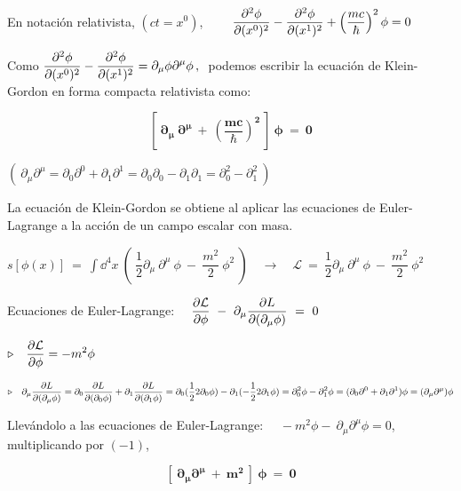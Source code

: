 En notación relativista, $(ct=x^0)$,
$\qquad \displaystyle \pdv[2]{\phi}{(x^0)} - \pdv[2]{\phi}{(x^1)} + \left(\dfrac{mc}{\hbar} \right)^2 \phi=0$

Como $\displaystyle \pdv[2]{\phi}{(x^0)} - \pdv[2]{\phi}{(x^1)}=\partial_\mu \phi \partial^\mu \phi\, , \ $ podemos escribir la ecuación de Klein-Gordon en forma compacta relativista como:

\begin{equation}
\label{T33EcK-G}
\boldsymbol{ \boxed{\ \  
\left[ \ \partial_\mu \ \partial^\mu \ + \ \left(\dfrac{mc}{\hbar} \right)^2 \ \right] \ \phi \ = \ 0
 \ \ } }	
 \end{equation}
 
\begin{flushright} \begin{scriptsize} \textcolor{gris}{$(\ \partial_\mu \partial^\mu=\partial_0\partial^0+\partial_1\partial^1=\partial_0\partial_0 - \partial_1\partial_1=\partial_0^2-\partial_1^2 \ )$  } \end{scriptsize} \end{flushright}

\vspace{1cm}
\begin{tarongeta}
	La ecuación de Klein-Gordon se obtiene al aplicar las ecuaciones de Euler-Lagrange a la acción de un campo escalar con masa.
	
	$s[\phi(x)] \ = \ \displaystyle \int \dd^4 x \ \left( \ \dfrac 1 2 \partial_\mu \ \partial^\mu \ \phi \ - \ \dfrac{m^2}{2} \ \phi^2 \ \right) \quad \to \quad \mathcal L \ = \ \dfrac 1 2 \partial_\mu \ \partial^\mu \ \phi \ - \ \dfrac{m^2}{2} \ \phi^2 $
	
	Ecuaciones de Euler-Lagrange:  $\quad \displaystyle \pdv{\mathcal L}{\phi} \ - \ \partial_\mu \pdv{L}{(\partial_\mu \phi)} \ = \ 0$
	
	$\triangleright \quad \displaystyle \pdv{\mathcal L}{\phi} = -m^2 \phi$
	
$\triangleright \quad \displaystyle \partial_\mu \pdv{L}{(\partial_\mu \phi)} = \partial_0 \pdv{L}{(\partial_0 \phi)} + \partial_1 \pdv{L}{(\partial_1 \phi)}= \partial_0(\dfrac 1 2 2 \partial_0 \phi) - 
\partial_1(-\dfrac 1 2 2 \partial_1 \phi)=\partial_0^2 \phi-\partial_1^2 \phi= (\partial_0 \partial^0 + \partial_1 \partial^1 )\phi=(\partial_\mu \partial^\mu)\phi$

Llevándolo a las ecuaciones de Euler-Lagrange: $\quad -m^2\phi - \ \partial_\mu \partial^\mu \phi =0$, multiplicando por $(-1)$,

$$\boldsymbol{ [\ \partial_\mu \partial^\mu \ + \ m^2\ ] \ \phi \ = \ 0 }$$
\end{tarongeta}

